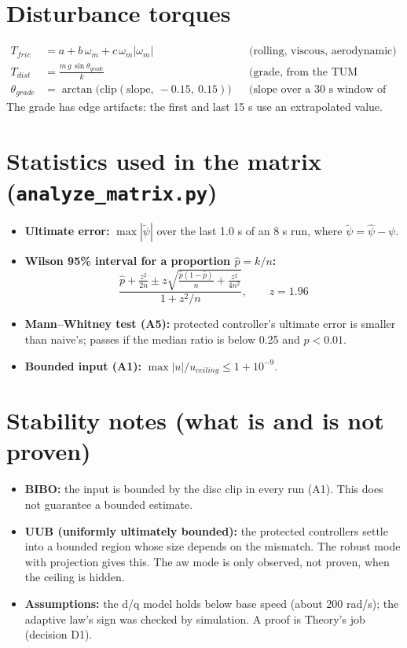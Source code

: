 \documentclass[11pt]{article}
\begin{document}
\section{Disturbance torques}
\begin{align}
T_{fric} &= a + b\,\omega_m + c\,\omega_m|\omega_m| &&\text{(rolling, viscous, aerodynamic)}\\
T_{dist} &= \frac{m\, g\, \sin\theta_{grade}}{k} &&\text{(grade, from the TUM elevation)}\\
\theta_{grade} &= \arctan\!\big(\mathrm{clip}(\text{slope},\ -0.15,\ 0.15)\big) &&\text{(slope over a 30 s window of distance)}
\end{align}
The grade has edge artifacts: the first and last 15 s use an extrapolated value.

\section{Statistics used in the matrix (\texttt{analyze\_matrix.py})}
\begin{itemize}
\item \textbf{Ultimate error:} $\max|\tilde\psi|$ over the last 1.0 s of an 8 s run, where $\tilde\psi = \hat\psi - \psi$.
\item \textbf{Wilson 95\% interval for a proportion $\hat p = k/n$:}
\begin{equation}
\frac{\hat p + \frac{z^2}{2n} \pm z\sqrt{\frac{\hat p(1-\hat p)}{n} + \frac{z^2}{4n^2}}}{1 + z^2/n}, \qquad z = 1.96
\end{equation}
\item \textbf{Mann--Whitney test (A5):} protected controller's ultimate error is smaller than naive's; passes if the median ratio is below 0.25 and $p < 0.01$.
\item \textbf{Bounded input (A1):} $\max|u|/u_{ceiling} \le 1 + 10^{-9}$.
\end{itemize}

\section{Stability notes (what is and is not proven)}
\begin{itemize}
\item \textbf{BIBO:} the input is bounded by the disc clip in every run (A1). This does not guarantee a bounded estimate.
\item \textbf{UUB (uniformly ultimately bounded):} the protected controllers settle into a bounded region whose size depends on the mismatch. The robust mode with projection gives this. The aw mode is only observed, not proven, when the ceiling is hidden.
\item \textbf{Assumptions:} the d/q model holds below base speed (about 200 rad/s); the adaptive law's sign was checked by simulation. A proof is Theory's job (decision D1).
\end{itemize}
\end{document}
